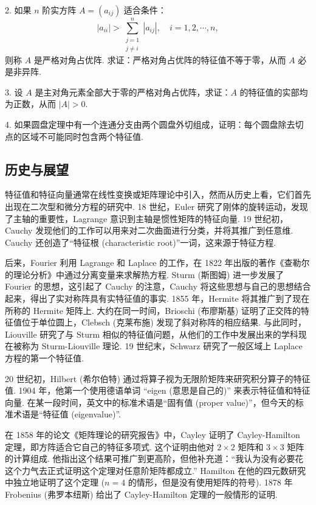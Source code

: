 \documentclass[UTF8, 12pt, fontset=fandol, oneside]{ctexart}
\begin{document}
2. 如果 $n$ 阶实方阵 $A=(a_{ij})$ 适合条件：
\[
|a_{ii}|>\sum_{\substack{j=1\\j\neq i}}^n |a_{ij}|,\quad i=1,2,\cdots,n,
\]
则称 $A$ 是严格对角占优阵. 求证：严格对角占优阵的特征值不等于零，从而 $A$ 必是非异阵.

3. 设 $A$ 是主对角元素全部大于零的严格对角占优阵，求证：$A$ 的特征值的实部均为正数，从而 $|A|>0$.

4. 如果圆盘定理中有一个连通分支由两个圆盘外切组成，证明：每个圆盘除去切点的区域不可能同时包含两个特征值.

\subsection*{历史与展望}

特征值和特征向量通常在线性变换或矩阵理论中引入，然而从历史上看，它们首先出现在二次型和微分方程的研究中. 18 世纪，Euler 研究了刚体的旋转运动，发现了主轴的重要性，Lagrange 意识到主轴是惯性矩阵的特征向量. 19 世纪初，Cauchy 发现他们的工作可以用来对二次曲面进行分类，并将其推广到任意维. Cauchy 还创造了“特征根 (characteristic root)”一词，这来源于特征方程.

后来，Fourier 利用 Lagrange 和 Laplace 的工作，在 1822 年出版的著作《查勒尔的理论分析》中通过分离变量来求解热方程. Sturm (斯图姆) 进一步发展了 Fourier 的思想，这引起了 Cauchy 的注意，Cauchy 将这些思想与自己的思想结合起来，得出了实对称阵具有实特征值的事实. 1855 年，Hermite 将其推广到了现在所称的 Hermite 矩阵上. 大约在同一时间，Brioschi (布廖斯基) 证明了正交阵的特征值位于单位圆上，Clebsch (克莱布施) 发现了斜对称阵的相应结果. 与此同时，Liouville 研究了与 Sturm 相似的特征值问题，从他们的工作中发展出来的学科现在被称为 Sturm-Liouville 理论. 19 世纪末，Schwarz 研究了一般区域上 Laplace 方程的第一个特征值.

20 世纪初，Hilbert (希尔伯特) 通过将算子视为无限阶矩阵来研究积分算子的特征值. 1904 年，他第一个使用德语单词 “eigen (意思是自己的)” 来表示特征值和特征向量. 在某一段时间，英文中的标准术语是“固有值 (proper value)”，但今天的标准术语是“特征值 (eigenvalue)”.

在 1858 年的论文《矩阵理论的研究报告》中，Cayley 证明了 Cayley-Hamilton 定理，即方阵适合它自己的特征多项式. 这个证明由他对 $2\times 2$ 矩阵和 $3\times 3$ 矩阵的计算组成. 他指出这个结果可推广到更高阶，但他补充道：“我认为没有必要花这个力气去正式证明这个定理对任意阶矩阵都成立.” Hamilton 在他的四元数研究中独立地证明了这个定理 ($n=4$ 的情形，但是没有使用矩阵的符号). 1878 年 Frobenius (弗罗本纽斯) 给出了 Cayley-Hamilton 定理的一般情形的证明.
\end{document}
